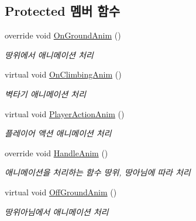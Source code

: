 \subsection*{Protected 멤버 함수}
\begin{DoxyCompactItemize}
\item 
override void \mbox{\hyperlink{class_player_state_a0601d37ab4c98941980ffaa4ec69b2c0}{On\+Ground\+Anim}} ()
\begin{DoxyCompactList}\small\item\em 땅위에서 애니메이션 처리 \end{DoxyCompactList}\item 
virtual void \mbox{\hyperlink{class_player_state_a7e63f7318e2aea3c2e7612e8ccedf13b}{On\+Climbing\+Anim}} ()
\begin{DoxyCompactList}\small\item\em 벽타기 애니메이션 처리 \end{DoxyCompactList}\item 
virtual void \mbox{\hyperlink{class_player_state_a112abec691914fd4e508cf27dd6b2b07}{Player\+Action\+Anim}} ()
\begin{DoxyCompactList}\small\item\em 플레이어 액션 애니메이션 처리 \end{DoxyCompactList}\item 
override void \mbox{\hyperlink{class_player_state_ae57c0c11c946d701bb1e0eb2bc7204dd}{Handle\+Anim}} ()
\begin{DoxyCompactList}\small\item\em 애니메이션을 처리하는 함수\textquotesingle{} 땅위, 땅아님에 따라 처리 \end{DoxyCompactList}\item 
virtual void \mbox{\hyperlink{class_state_a2909a234430fa7752fadf2bb993ab5e2}{Off\+Ground\+Anim}} ()
\begin{DoxyCompactList}\small\item\em 땅위아님에서 애니메이션 처리 \end{DoxyCompactList}\end{DoxyCompactItemize}
